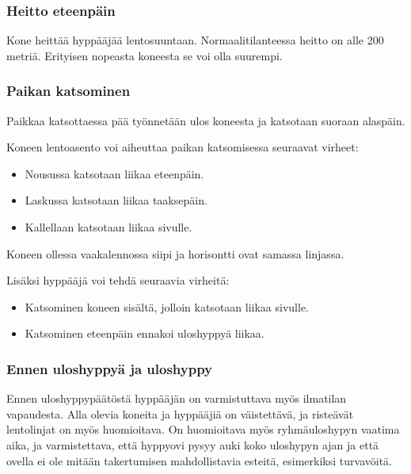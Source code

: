 \subsubsection{Heitto eteenpäin}
\label{uloshyppypaikan-maaritys-heitto-eteenpain}


Kone heittää hyppääjää lentosuuntaan. Normaalitilanteessa heitto on alle 200 metriä. Erityisen nopeasta koneesta se voi olla suurempi. 

\subsubsection{Paikan katsominen}
\label{uloshyppypaikan-maaritys-paikan-katsominen}


Paikkaa katsottaessa pää työnnetään ulos koneesta ja katsotaan suoraan alaspäin.  


Koneen lentoasento voi aiheuttaa paikan katsomisessa seuraavat virheet: 

\begin{itemize}
\item  Nousussa katsotaan liikaa eteenpäin. 
\item  Laskussa katsotaan liikaa taaksepäin. 
\item  Kallellaan katsotaan liikaa sivulle. 
\end{itemize}

Koneen ollessa vaakalennossa siipi ja horisontti ovat samassa linjassa. 


Lisäksi hyppääjä voi tehdä seuraavia virheitä: 

\begin{itemize}
\item  Katsominen koneen sisältä, jolloin katsotaan liikaa sivulle. 
\item  Katsominen eteenpäin ennakoi uloshyppyä liikaa. 
\end{itemize}
\subsubsection{Ennen uloshyppyä ja uloshyppy}
\label{uloshyppypaikan-maaritys-ennen-uloshyppya-ja-uloshyppy}


Ennen uloshyppypäätöstä hyppääjän on varmistuttava myös ilmatilan vapaudesta. Alla olevia koneita ja hyppääjiä on väistettävä, ja risteävät lentolinjat on myös huomioitava. On huomioitava myös ryhmäuloshypyn vaatima aika, ja varmistettava, että hyppyovi pysyy auki koko uloshypyn ajan ja että ovella ei ole mitään takertumisen mahdollistavia esteitä, esimerkiksi turvavöitä.  


